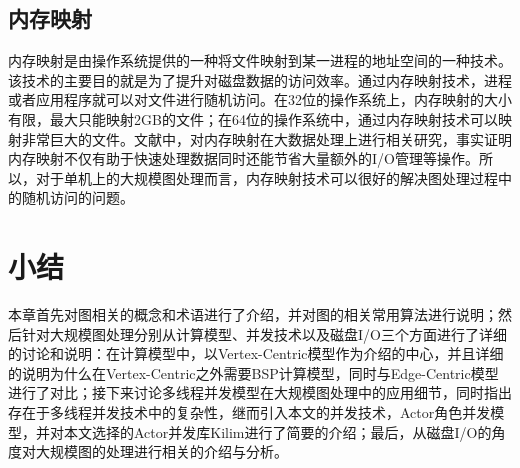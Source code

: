 \subsection{内存映射}


内存映射是由操作系统提供的一种将文件映射到某一进程的地址空间的一种技术。该技术的主要目的就是为了提升对磁盘数据的访问效率。通过内存映射技术，进程或者应用程序就可以对文件进行随机访问。在32位的操作系统上，内存映射的大小有限，最大只能映射2GB的文件；在64位的操作系统中，通过内存映射技术可以映射非常巨大的文件。文献中，对内存映射在大数据处理上进行相关研究，事实证明内存映射不仅有助于快速处理数据同时还能节省大量额外的I/O管理等操作。所以，对于单机上的大规模图处理而言，内存映射技术可以很好的解决图处理过程中的随机访问的问题。


\section{小结}

本章首先对图相关的概念和术语进行了介绍，并对图的相关常用算法进行说明；然后针对大规模图处理分别从计算模型、并发技术以及磁盘I/O三个方面进行了详细的讨论和说明：在计算模型中，以Vertex-Centric模型作为介绍的中心，并且详细的说明为什么在Vertex-Centric之外需要BSP计算模型，同时与Edge-Centric模型进行了对比；接下来讨论多线程并发模型在大规模图处理中的应用细节，同时指出存在于多线程并发技术中的复杂性，继而引入本文的并发技术，Actor角色并发模型，并对本文选择的Actor并发库Kilim进行了简要的介绍；最后，从磁盘I/O的角度对大规模图的处理进行相关的介绍与分析。